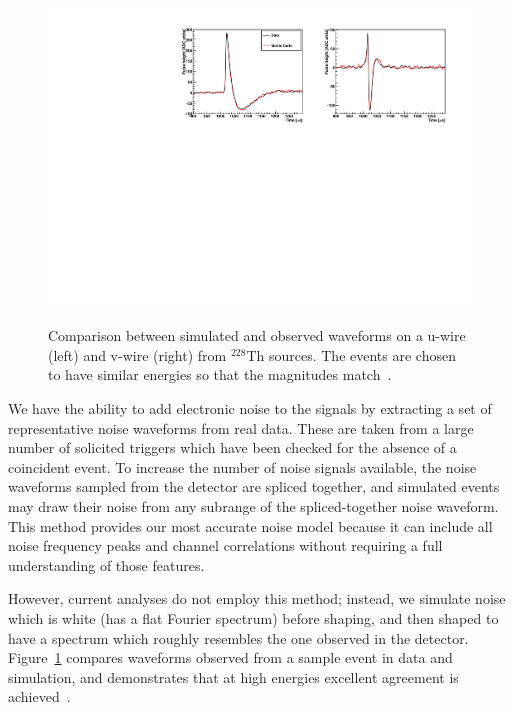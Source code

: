 \begin{figure}
\begin{center}
\includegraphics[keepaspectratio=true,width=\textwidth]{pulse_comp.pdf}
\end{center}
\renewcommand{\baselinestretch}{1}
\small\normalsize
\begin{quote}
\caption{Comparison between simulated and observed waveforms on a u-wire (left) and v-wire (right) from $^{228}$Th sources.  The events are chosen to have similar energies so that the magnitudes match~\cite{MCDocumentRun2a}.}
\label{fig:MCPulseComparison}
\end{quote}
\end{figure}
\renewcommand{\baselinestretch}{2}
\small\normalsize

We have the ability to add electronic noise to the signals by extracting a set of representative noise waveforms from real data.  These are taken from a large number of solicited triggers which have been checked for the absence of a coincident event.  To increase the number of noise signals available, the noise waveforms sampled from the detector are spliced together, and simulated events may draw their noise from any subrange of the spliced-together noise waveform.  This method provides our most accurate noise model because it can include all noise frequency peaks and channel correlations without requiring a full understanding of those features.

However, current analyses do not employ this method; instead, we simulate noise which is white (has a flat Fourier spectrum) before shaping, and then shaped to have a spectrum which roughly resembles the one observed in the detector.  Figure~\ref{fig:MCPulseComparison} compares waveforms observed from a sample event in data and simulation, and demonstrates that at high energies excellent agreement is achieved~\cite{MCDocumentRun2a}.

